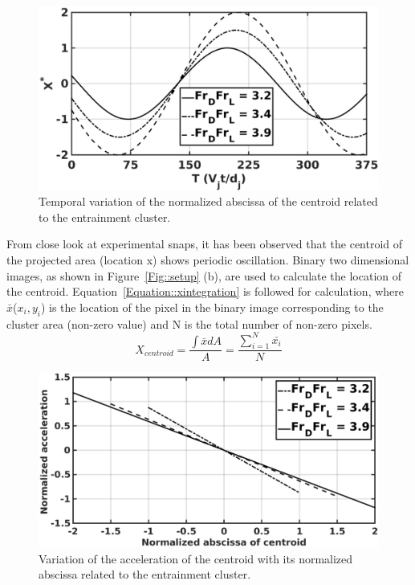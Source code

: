 \begin{figure}
	\centering
	\includegraphics[width=\linewidth]{chapters/jetPool/Figure17}
	\caption{Temporal variation of the normalized abscissa of the centroid related to the entrainment cluster.}
	\label{figure::solution}
\end{figure}
From close look at experimental snaps, it has been observed that the centroid of the projected area (location x) shows periodic oscillation. Binary two dimensional images, as shown in Figure~\ref{Fig::setup} (b), are used to calculate the location of the centroid. Equation~\ref{Equation::xintegration} is followed for calculation, where $\bar{x}$($x_i , y_i$) is the location of the pixel in the binary image corresponding to the cluster area (non-zero value) and N is the total number of non-zero pixels.
\begin{equation}
X_{centroid} = \frac{\int \bar{x}dA}{A} = \frac{\sum_{i = 1}^{N}\bar{x_i}}{N}
\label{Equation::xintegration}
\end{equation}
\begin{figure}
	\centering
	\includegraphics[width=\linewidth]{chapters/jetPool/Figure18}
	\caption{Variation of the acceleration of the centroid with its normalized abscissa related to the entrainment cluster.}
	\label{figure::acc}
\end{figure}
